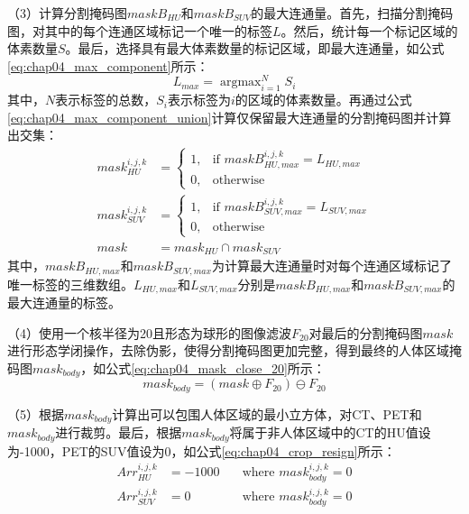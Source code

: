 （3）计算分割掩码图\(maskB_{HU}\)和\(maskB_{SUV}\)的最大连通量。首先，扫描分割掩码图，对其中的每个连通区域标记一个唯一的标签\(L\)。然后，统计每一个标记区域的体素数量\(S\)。最后，选择具有最大体素数量的标记区域，即最大连通量，如公式\ref{eq:chap04_max_component}所示：
\begin{equation}
  L_{max} = \mathop{\arg\max}_{i=1}^N S_i
  \label{eq:chap04_max_component}
\end{equation}
其中，\(N\)表示标签的总数，\(S_i\)表示标签为\(i\)的区域的体素数量。再通过公式\ref{eq:chap04_max_component_union}计算仅保留最大连通量的分割掩码图并计算出交集：
\begin{equation}
  \begin{aligned}
    mask_{HU}^{i,j,k}  & =
    \begin{cases}
      1, & \text{if \(maskB_{HU, max}^{i,j,k} = L_{HU,max}\)} \\
      0, & \text{otherwise}
    \end{cases}  \\
    mask_{SUV}^{i,j,k} & =
    \begin{cases}
      1, & \text{if \(maskB_{SUV, max}^{i,j,k} = L_{SUV,max}\)} \\
      0, & \text{otherwise}
    \end{cases} \\
    mask               & = mask_{HU} \cap mask_{SUV}
  \end{aligned}
  \label{eq:chap04_max_component_union}
\end{equation}
其中，\(maskB_{HU, max}\)和\(maskB_{SUV, max}\)为计算最大连通量时对每个连通区域标记了唯一标签的三维数组。\(L_{HU,max}\)和\(L_{SUV,max}\)分别是\(maskB_{HU, max}\)和\(maskB_{SUV, max}\)的最大连通量的标签。

（4）使用一个核半径为20且形态为球形的图像滤波\(F_{20}\)对最后的分割掩码图\(mask\)进行形态学闭操作，去除伪影，使得分割掩码图更加完整，得到最终的人体区域掩码图\(mask_{body}\)，如公式\ref{eq:chap04_mask_close_20}所示：
\begin{equation}
  mask_{body} = (mask \oplus F_{20} ) \ominus F_{20}
  \label{eq:chap04_mask_close_20}
\end{equation}

（5）根据\(mask_{body}\)计算出可以包围人体区域的最小立方体，对CT、PET和\(mask_{body}\)进行裁剪。最后，根据\(mask_{body}\)将属于非人体区域中的CT的HU值设为-1000，PET的SUV值设为0，如公式\ref{eq:chap04_crop_resign}所示：
\begin{equation}
  \begin{aligned}
    Arr_{HU}^{i, j, k}  & = -1000 \quad & \text{where \(mask_{body}^{i,j,k} = 0\)} \\
    Arr_{SUV}^{i, j, k} & = 0 \quad     & \text{where \(mask_{body}^{i,j,k} = 0\)}
  \end{aligned}
  \label{eq:chap04_crop_resign}
\end{equation}

